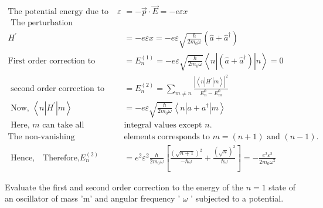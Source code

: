 \begin{answer}
	\begin{align*}
	\text{The potential energy due to the field $\varepsilon$}&\text{$=-\vec{p} \cdot \vec{E}=-e \varepsilon x$}\\
\text{	The perturbation }&\\
H^{\prime}&=-e \varepsilon x=-e \varepsilon \sqrt{\frac{\hbar}{2 m_{0} \omega}}\left(\hat{a}+\hat{a}^{\dagger}\right)\\
	\text{First order correction to energy}
	&=E_{n}^{(1)}=-e \varepsilon \sqrt{\frac{\hbar}{2 m_{0} \omega}}\left\langle n\left|\left(\hat{a}+\hat{a}^{\dagger}\right)\right| n\right\rangle=0\\
	\text { second order correction to energy }&=E_{n}^{(2)}=\sum_{m \neq n} \frac{\left|\left\langle n\left|H^{\prime}\right| m\right\rangle\right|^{2}}{E_{n}^{0}-E_{m}^{0}}\\
	\text { Now, }\left\langle n\left|H^{\prime}\right| m\right\rangle&=-e \varepsilon \sqrt{\frac{\hbar}{2 m_{0} \omega}}\left\langle n\left|a+a^{\dagger}\right| m\right\rangle\\
\text{	Here, $m$ can take all }&\text{integral values except $n$.}\\
	\text{The non-vanishing }&\text{elements corresponds to $m=(n+1)$ and $(n-1)$.}\\
\text{	Hence,$\quad$
	Therefore,} E_{n}^{(2)}&=e^{2} \varepsilon^{2} \frac{\hbar}{2 m_{0} \omega}\left[\frac{(\sqrt{n+1})^{2}}{-\hbar \omega}+\frac{(\sqrt{n})^{2}}{\hbar \omega}\right]=-\frac{e^{2} \varepsilon^{2}}{2 m_{0} \omega^{2}}
	\end{align*}
\end{answer}
\begin{exercise}
	 Evaluate the first and second order correction to the energy of the $n=1$ state of an oscillator of mass 'm' and angular frequency ' $\omega$ ' subjected to a potential.
\end{exercise}
